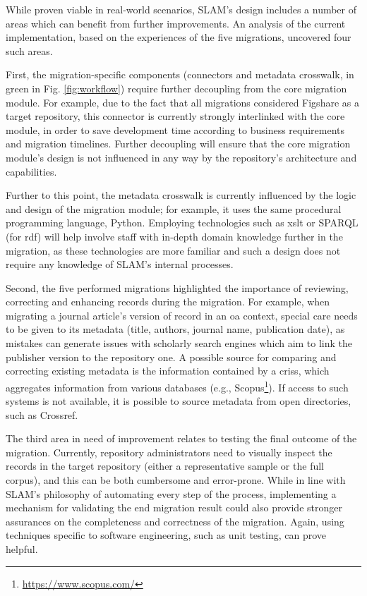While proven viable in real-world scenarios, SLAM's design includes a number of areas which can benefit from further improvements. An analysis of the current implementation, based on the experiences of the five migrations, uncovered four such areas.

First, the migration-specific components (connectors and metadata crosswalk, in green in Fig. \ref{fig:workflow}) require further decoupling from the core migration module. For example, due to the fact that all migrations considered Figshare as a target repository, this connector is currently strongly interlinked with the core module, in order to save development time according to business requirements and migration timelines. Further decoupling will ensure that the core migration module's design is not influenced in any way by the repository's architecture and capabilities.

Further to this point, the metadata crosswalk is currently influenced by the logic and design of the migration module; for example, it uses the same procedural programming language, Python. Employing technologies such as \gls{xslt} or SPARQL (for \gls{rdf}) will help involve staff with in-depth domain knowledge further in the migration, as these technologies are more familiar and such a design does not require any knowledge of SLAM's internal processes.

Second, the five performed migrations highlighted the importance of reviewing, correcting and enhancing records during the migration. For example, when migrating a journal article's version of record in an \gls{oa} context, special care needs to be given to its metadata (title, authors, journal name, publication date), as mistakes can generate issues with scholarly search engines which aim to link the publisher version to the repository one. A possible source for comparing and correcting existing metadata is the information contained by a \glspl{cris}, which aggregates information from various databases (e.g., Scopus\footnote{\url{https://www.scopus.com/}}). If access to such systems is not available, it is possible to source metadata from open directories, such as Crossref.

The third area in need of improvement relates to testing the final outcome of the migration. Currently, repository administrators need to visually inspect the records in the target repository (either a representative sample or the full corpus), and this can be both cumbersome and error-prone. While in line with SLAM's philosophy of automating every step of the process, implementing a mechanism for validating the end migration result could also provide stronger assurances on the completeness and correctness of the migration. Again, using techniques specific to software engineering, such as unit testing, can prove helpful.

